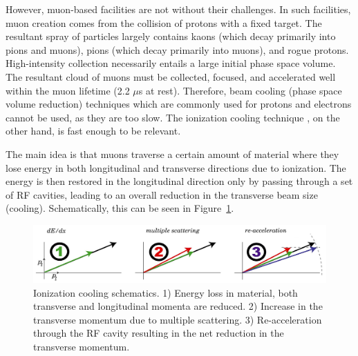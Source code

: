 \documentclass[a4paper,11pt]{article}
\begin{document}
However, muon-based facilities are not without their challenges. In such facilities, muon creation comes from the collision of protons with a fixed target. The resultant spray of particles largely contains kaons (which decay primarily into pions and muons), pions (which decay primarily into muons), and rogue protons. High-intensity collection necessarily entails a large initial phase space volume. The resultant cloud of muons must be collected, focused, and accelerated well within the muon lifetime (2.2 $\mu$s at rest). Therefore, beam cooling (phase space volume reduction) techniques which are commonly used for protons and electrons cannot be used, as they are too slow. The ionization cooling technique \cite{Parkhomchuk}, on the other hand, is fast enough to be relevant. 




\iffalse
The main idea is that muons traverse a certain amount of material where they lose energy in both longitudinal and transverse directions due to ionization. The energy is then restored in the longitudinal direction only by passing through a set of RF cavities, leading to an overall reduction in the transverse beam size (cooling). Schematically, this can be seen in Figure~\ref{fig:cooling_vector}.

\begin{figure}[htb] 
\centering
\includegraphics[width=\columnwidth]{cooling_vector}
\caption{Ionization cooling schematics. 1) Energy loss in material, both transverse and longitudinal momenta are reduced. 2) Increase in the transverse momentum due to multiple scattering.  3) Re-acceleration through the RF cavity resulting in the net reduction in the transverse momentum.}
\label{fig:cooling_vector}
\end{figure}
\end{document}
